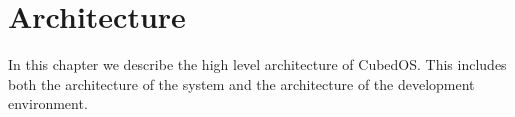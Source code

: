 
\section{Architecture}
\label{sec:design-architecture}

In this chapter we describe the high level architecture of CubedOS. This includes both the
architecture of the system and the architecture of the development environment.





